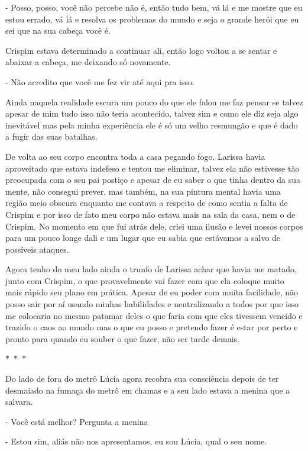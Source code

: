 - Posso, posso, você não percebe não é, então tudo bem, vá lá e me mostre que eu estou errado, vá lá e resolva os problemas do mundo e seja o grande herói que eu sei que na sua cabeça você é.


Crispim estava determinado a continuar ali, então logo voltou a se sentar e abaixar a cabeça, me deixando só novamente. 

- Não acredito que você me fez vir até aqui pra isso.

Ainda naquela realidade escura um pouco do que ele falou me faz pensar se talvez apesar de mim tudo isso não teria acontecido, talvez sim e como ele diz seja algo inevitável mas pela minha experiência ele é só um velho resmungão e que é dado a fugir das suas batalhas.

De volta ao seu corpo encontra toda a casa pegando fogo. Larissa havia aproveitado que estava indefeso e tentou me eliminar, talvez ela não estivesse tão preocupada com o seu pai postiço e apesar de eu saber o que tinha dentro da sua mente, não consegui prever, mas também, na sua pintura mental havia uma região meio obscura enquanto me contava a respeito de como sentia a falta de Crispim e por isso de fato meu corpo não estava mais na sala da casa, nem o de Crispim. No momento em que fui atrás dele, criei uma ilusão e levei nossos corpos para um pouco longe dali e um lugar que eu sabia que estávamos a salvo de possíveis ataques.

Agora tenho do meu lado ainda o trunfo de Larissa achar que havia me matado, junto com Crispim, o que provavelmente vai fazer com que ela coloque muito mais rápido seu plano em prática. Apesar de eu poder com muita facilidade, não posso sair por aí usando minhas habilidades e neutralizando a todos por que isso me colocaria no mesmo patamar deles o que faria com que eles tivessem vencido e trazido o caos ao mundo mas o que eu posso e pretendo fazer é estar por perto e pronto para quando eu souber o que fazer, não ser tarde demais.

\begin{center}
	$\ast$~$\ast$~$\ast$
\end{center}

Do lado de fora do metrô Lúcia agora recobra sua consciência depois de ter desmaiado na fumaça do metrô em chamas e a seu lado estava a menina que a salvara.

- Você está melhor? Pergunta a menina

- Estou sim, aliás não nos apresentamos, eu sou Lúcia, qual o seu nome.


